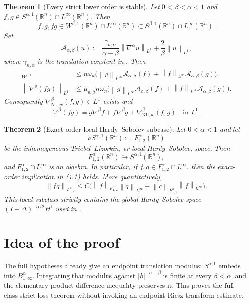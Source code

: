 \documentclass[11pt]{article}
\newtheorem{theorem}{Theorem}
\newcommand{\Rn}{\mathbb{R}^n}
\newcommand{\norm}[1]{\left\lVert #1\right\rVert}
\begin{document}
\begin{theorem}[Every strict lower order is stable]\label{thm:loss}
Let $0<\beta<\alpha<1$ and
$f,g\in S^{\alpha,1}(\Rn)\cap L^\infty(\Rn)$.  Then
\[
 f,g,fg\in W^{\beta,1}(\Rn)\cap L^\infty(\Rn)
       \subset S^{\beta,1}(\Rn)\cap L^\infty(\Rn).
\]
Set
\[
 \mathcal A_{\alpha,\beta}(u)
 :=\frac{\gamma_{n,\alpha}}{\alpha-\beta}
       \norm{\nabla^\alpha u}_{L^1}
   +\frac{2}{\beta}\norm{u}_{L^1},                         \tag{2.1}
\]
where $\gamma_{n,\alpha}$ is the translation constant in
\cite[Proposition~A.1]{BrueCalziComiStefani}.  Then
\begin{align}
 [fg]_{W^{\beta,1}}
 &\le n\omega_n\bigl(
       \norm{g}_{L^\infty}\mathcal A_{\alpha,\beta}(f)
      +\norm{f}_{L^\infty}\mathcal A_{\alpha,\beta}(g)\bigr), \tag{2.2}\\
 \norm{\nabla^\beta(fg)}_{L^1}
 &\le \mu_{n,\beta}n\omega_n\bigl(
       \norm{g}_{L^\infty}\mathcal A_{\alpha,\beta}(f)
      +\norm{f}_{L^\infty}\mathcal A_{\alpha,\beta}(g)\bigr). \tag{2.3}
\end{align}
Consequently $\nabla^\beta_{\mathrm{NL},w}(f,g)\in L^1$ exists and
\[
 \nabla^\beta(fg)=g\nabla^\beta f+f\nabla^\beta g
                  +\nabla^\beta_{\mathrm{NL},w}(f,g)
 \quad\text{in }L^1.                                      \tag{2.4}
\]
\end{theorem}

\begin{theorem}[Exact-order local Hardy--Sobolev subcase]\label{thm:hardy}
Let $0<\alpha<1$ and let
\[
 hS^{\alpha,1}(\Rn):=F^\alpha_{1,2}(\Rn)
\]
be the inhomogeneous Triebel--Lizorkin, or local Hardy--Sobolev, space.
Then
\[
 F^\alpha_{1,2}(\Rn)\hookrightarrow S^{\alpha,1}(\Rn),    \tag{2.5}
\]
and $F^\alpha_{1,2}\cap L^\infty$ is an algebra.  In particular, if
$f,g\in F^\alpha_{1,2}\cap L^\infty$, then the exact-order implication in
(1.1) holds.  More quantitatively,
\[
 \norm{fg}_{F^\alpha_{1,2}}
 \le C\bigl(
    \norm f_{F^\alpha_{1,2}}\norm g_{L^\infty}
   +\norm g_{F^\alpha_{1,2}}\norm f_{L^\infty}\bigr).      \tag{2.6}
\]
This local subclass strictly contains the global Hardy--Sobolev space
$(I-\Delta)^{-\alpha/2}H^1$ used in \cite{BrueCalziComiStefani}.
\end{theorem}

\section{Idea of the proof}

The full hypotheses already give an endpoint translation modulus:
$S^{\alpha,1}$ embeds into $B^\alpha_{1,\infty}$.  Integrating that modulus
against $|h|^{-n-\beta}$ is finite at every $\beta<\alpha$, and the elementary
product difference inequality preserves it.  This proves the full-class
strict-loss theorem without invoking an endpoint Riesz-transform estimate.
\end{document}
